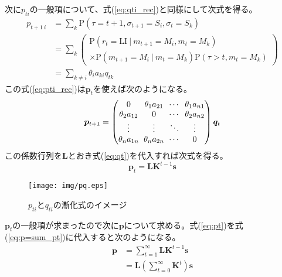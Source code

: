 \documentclass{jarticle}
\numberwithin{equation}{section}
\numberwithin{table}{section}
\numberwithin{figure}{section}
\theoremstyle{plain}
\begin{document}
次に$ p_{t i} $の一般項について、式(\ref{eq:qti_rec})と同様にして次式を得る。
\begin{align}
    p_{t+1\ i} & = \! \sum_{k} \mathrm{P}(\tau = t + 1 , \sigma_{t+1} = S_i , \sigma_t = S_k) \nonumber\\
    & = \! \sum_{k} \left(
        \begin{array}{l}
            \mathrm{P}(r_t = \mathrm{LI}\ |\ m_{t+1} \! = \! M_i , m_t \! = \! M_k) \\
            \times \mathrm{P}(m_{t+1} \! = \! M_i\ |\ m_t \! = \! M_k) \mathrm{P}(\tau \! > \! t , m_t \! = \! M_k)
        \end{array}
    \right) \nonumber\\
    & = \! \sum_{k \ne i} \theta_i a_{k i} q_{t k}
    \label{eq:pti_rec}
\end{align}
この式(\ref{eq:pti_rec})は$ \bm{p}_t $を使えば次のようになる。
\begin{equation}
    \arraycolsep3pt
    \bm{p}_{t + 1} = 
    \begin{pmatrix}
        0 & \theta_1 a_{2 1} & \cdots & \theta_1 a_{n 1} \\
        \theta_2 a_{1 2} & 0 & \cdots & \theta_2 a_{n 2} \\
        \vdots & \vdots & \ddots & \vdots \\
        \theta_n a_{1 n} & \theta_n a_{2 n} & \cdots & 0 \\
    \end{pmatrix}
    \bm{q}_t
\end{equation}
この係数行列を$ \bm{L} $とおき式(\ref{eq:qt})を代入すれば次式を得る。
\begin{equation} \label{eq:pt}
    \bm{p}_t = \bm{L} \bm{K}^{t - 1} \bm{s}
\end{equation}

\begin{figure}[bt]
    \centering
    \texttt{[image: img/pq.eps]}
    \caption{$ p_{t i} $と$ q_{t i} $の漸化式のイメージ}
\end{figure}

$ \bm{p}_t $の一般項が求まったので次に$ \bm{p} $について求める。式(\ref{eq:pt})を式(\ref{eq:p=sum_pt})に代入すると次のようになる。
\begin{align}
    \bm{p} &= \sum_{t=1}^{\infty} \bm{L} \bm{K}^{t - 1} \bm{s} \nonumber \\
    &= \bm{L} \left( \sum_{t=0}^{\infty} \bm{K}^t \right) \bm{s} \label{eq:p_}
\end{align}
\end{document}
